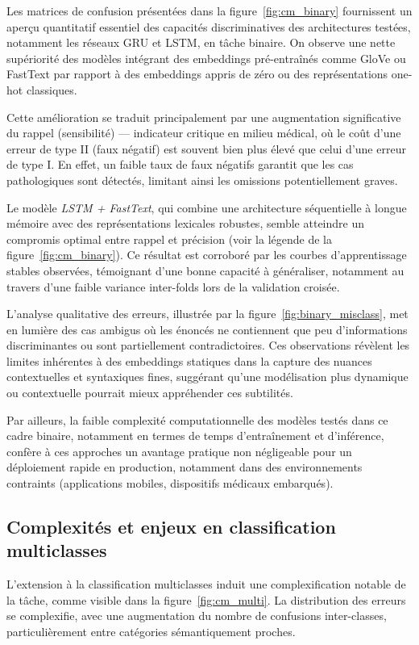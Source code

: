 \documentclass[12pt]{report}
\begin{document}
Les matrices de confusion présentées dans la figure~\ref{fig:cm_binary} fournissent un aperçu quantitatif essentiel des capacités discriminatives des architectures testées, notamment les réseaux GRU et LSTM, en tâche binaire. On observe une nette supériorité des modèles intégrant des embeddings pré-entraînés comme GloVe ou FastText par rapport à des embeddings appris de zéro ou des représentations one-hot classiques.

Cette amélioration se traduit principalement par une augmentation significative du rappel (sensibilité) — indicateur critique en milieu médical, où le coût d’une erreur de type II (faux négatif) est souvent bien plus élevé que celui d’une erreur de type I. En effet, un faible taux de faux négatifs garantit que les cas pathologiques sont détectés, limitant ainsi les omissions potentiellement graves.

Le modèle \textit{LSTM + FastText}, qui combine une architecture séquentielle à longue mémoire avec des représentations lexicales robustes, semble atteindre un compromis optimal entre rappel et précision (voir la légende de la figure~\ref{fig:cm_binary}). Ce résultat est corroboré par les courbes d’apprentissage stables observées, témoignant d’une bonne capacité à généraliser, notamment au travers d’une faible variance inter-folds lors de la validation croisée.

L’analyse qualitative des erreurs, illustrée par la figure~\ref{fig:binary_misclass}, met en lumière des cas ambigus où les énoncés ne contiennent que peu d’informations discriminantes ou sont partiellement contradictoires. Ces observations révèlent les limites inhérentes à des embeddings statiques dans la capture des nuances contextuelles et syntaxiques fines, suggérant qu’une modélisation plus dynamique ou contextuelle pourrait mieux appréhender ces subtilités.

Par ailleurs, la faible complexité computationnelle des modèles testés dans ce cadre binaire, notamment en termes de temps d’entraînement et d’inférence, confère à ces approches un avantage pratique non négligeable pour un déploiement rapide en production, notamment dans des environnements contraints (applications mobiles, dispositifs médicaux embarqués).

\subsection{Complexités et enjeux en classification multiclasses}

L’extension à la classification multiclasses induit une complexification notable de la tâche, comme visible dans la figure~\ref{fig:cm_multi}. La distribution des erreurs se complexifie, avec une augmentation du nombre de confusions inter-classes, particulièrement entre catégories sémantiquement proches.
\end{document}
